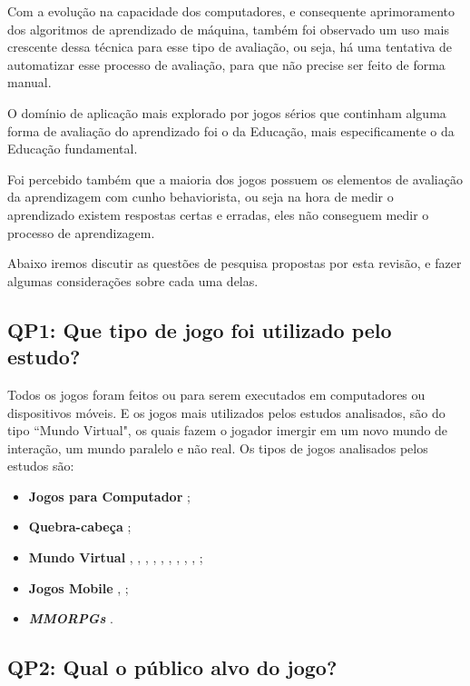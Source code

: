 \documentclass[12pt]{article}
\begin{document}
Com a evolução na capacidade dos computadores, e consequente aprimoramento dos algoritmos de aprendizado de máquina, também foi observado um uso mais crescente dessa técnica para esse tipo de avaliação, ou seja, há uma tentativa de automatizar esse processo de avaliação, para que não precise ser feito de forma manual.

O domínio de aplicação mais explorado por jogos sérios que continham alguma forma de avaliação do aprendizado foi o da Educação, mais especificamente o da Educação fundamental.

Foi percebido também que a maioria dos jogos possuem os elementos de avaliação da aprendizagem com cunho behaviorista, ou seja na hora de medir o aprendizado existem respostas certas e erradas, eles não conseguem medir o processo de aprendizagem.

Abaixo iremos discutir as questões de pesquisa propostas por esta revisão, e fazer algumas considerações sobre cada uma delas.

\subsection{QP1: Que tipo de jogo foi utilizado pelo estudo?}

Todos os jogos foram feitos ou para serem executados em computadores ou dispositivos móveis. E os jogos mais utilizados pelos estudos analisados, são do tipo ``Mundo Virtual", os quais fazem o jogador imergir em um novo mundo de interação, um mundo paralelo e não real. Os tipos de jogos analisados pelos estudos são:

\begin{itemize}
    \item \textbf{Jogos para Computador} \cite{del2010easing};
    \item \textbf{Quebra-cabeça} \cite{rowe2017assessing};
    \item \textbf{Mundo Virtual} \cite{moreno2007game}, \cite{thomas2012evaluate}, \cite{harpstead2013search}, \cite{baron2014approach}, \cite{de20163d}, \cite{mota2017environment}, \cite{falakmasir2016data}, \cite{georgiadis2019bolstering}, \cite{georgiadis2019reinforcing}, \cite{min2019deepstealth};
    \item \textbf{Jogos Mobile} \cite{kam2007localized}, \cite{kam2009improving};
    \item \textbf{\textit{MMORPGs}} \cite{conrad2014framework}.
\end{itemize}

\subsection{QP2: Qual o público alvo do jogo?}
\end{document}
